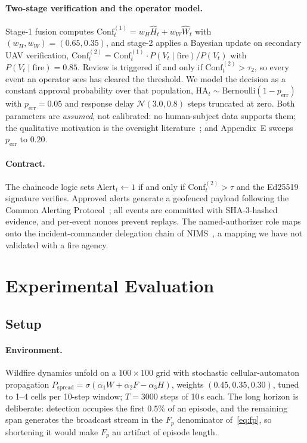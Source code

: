 \documentclass[letterpaper]{article} %
\newcommand{\Conf}{\text{Conf}}
\newcommand{\HA}{\text{HA}}
\newcommand{\appSensitivity}{E}
\begin{document}
\paragraph{Two-stage verification and the operator model.} Stage-1 fusion computes $\Conf_t^{(1)}=w_H\hat{H}_t+w_W\hat{W}_t$ with $(w_H,w_W)=(0.65,0.35)$, and stage-2 applies a Bayesian update on secondary UAV verification, $\Conf_t^{(2)}=\Conf_t^{(1)}\cdot P(V_t\mid\mathrm{fire})/P(V_t)$ with $P(V_t\mid\mathrm{fire})=0.85$. Review is triggered if and only if $\Conf_t^{(2)}>\tau_2$, so every event an operator sees has cleared the threshold. We model the decision as a constant approval probability over that population, $\HA_t\sim\mathrm{Bernoulli}(1-p_{\mathrm{err}})$ with $p_{\mathrm{err}}=0.05$ and response delay $\mathcal{N}(3.0,0.8)$ steps truncated at zero. Both parameters are \emph{assumed}, not calibrated: no human-subject data supports them; the qualitative motivation is the oversight literature~\citep{holzinger2025}; and Appendix~\appSensitivity{} sweeps $p_{\mathrm{err}}$ to $0.20$.

\paragraph{Contract.} The chaincode logic sets $\mathrm{Alert}_t\leftarrow 1$ if and only if $\Conf_t^{(2)}>\tau$ and the Ed25519 signature verifies. Approved alerts generate a geofenced payload following the Common Alerting Protocol~\citep{oasis2010cap}; all events are committed with SHA-3-hashed evidence, and per-event nonces prevent replays. The named-authorizer role maps onto the incident-commander delegation chain of NIMS~\citep{fema2017nims}, a mapping we have not validated with a fire agency.

\section{Experimental Evaluation}
\label{sec:experiments}

\subsection{Setup}
\label{sec:setup}

\paragraph{Environment.} Wildfire dynamics unfold on a $100\times100$ grid with stochastic cellular-automaton propagation $P_{\mathrm{spread}}=\sigma(\alpha_1 W+\alpha_2 F-\alpha_3 H)$, weights $(0.45,0.35,0.30)$, tuned to 1--4 cells per 10-step window; $T=3000$ steps of 10\,s each. The long horizon is deliberate: detection occupies the first $0.5\%$ of an episode, and the remaining span generates the broadcast stream in the $F_p$ denominator of~\eqref{eq:fp}, so shortening it would make $F_p$ an artifact of episode length.
\end{document}

